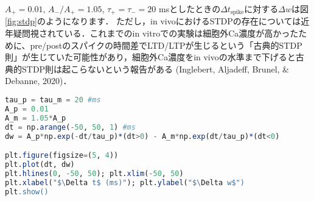 $A_+=0.01$, $A_-/A_+=1.05$, $\tau_{+}=\tau_{-}=20$ msとしたときの$\Delta t_{\text{spike}}$に対する$\Delta w$は図\ref{fig:stdp}のようになります．
ただし，in vivoにおけるSTDPの存在については近年疑問視されている．これまでのin vitroでの実験は細胞外Ca濃度が高かったために、pre/postのスパイクの時間差でLTD/LTPが生じるという「古典的STDP則」が生じていた可能性があり，細胞外Ca濃度をin vivoの水準まで下げると古典的STDP則は起こらないという報告がある (Inglebert, Aljadeff, Brunel, & Debanne, 2020)．
\begin{lstlisting}[language=julia]
tau_p = tau_m = 20 #ms
A_p = 0.01
A_m = 1.05*A_p
dt = np.arange(-50, 50, 1) #ms
dw = A_p*np.exp(-dt/tau_p)*(dt>0) - A_m*np.exp(dt/tau_p)*(dt<0) 

plt.figure(figsize=(5, 4))
plt.plot(dt, dw)
plt.hlines(0, -50, 50); plt.xlim(-50, 50)
plt.xlabel("$\Delta t$ (ms)"); plt.ylabel("$\Delta w$")
plt.show()
\end{lstlisting}
